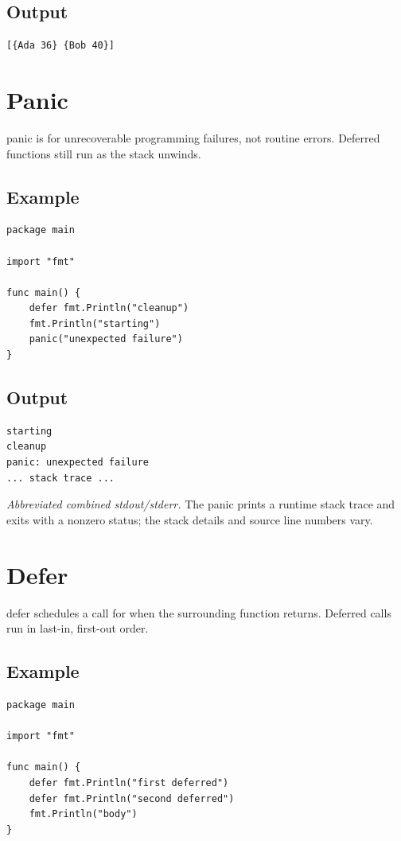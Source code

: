 \documentclass[10pt,oneside]{article}
\newcommand{\sectionline}{\par\vspace{4pt}{\color{rule}\hrule height .5pt}\vspace{7pt}\color{ink}\noindent}
\begin{document}
\subsection*{Output}
\begin{lstlisting}[style=terminal]
[{Ada 36} {Bob 40}]
\end{lstlisting}
\clearpage
\section{Panic}
\sectionline
panic is for unrecoverable programming failures, not routine errors. Deferred functions still run as the stack unwinds.\par
\subsection*{Example}
\begin{lstlisting}[style=gocode]
package main

import "fmt"

func main() {
	defer fmt.Println("cleanup")
	fmt.Println("starting")
	panic("unexpected failure")
}
\end{lstlisting}


\subsection*{Output}
\begin{lstlisting}[style=terminal]
starting
cleanup
panic: unexpected failure
... stack trace ...
\end{lstlisting}
\emph{Abbreviated combined stdout/stderr.} The panic prints a runtime stack trace and exits with a nonzero status; the stack details and source line numbers vary.
\clearpage
\section{Defer}
\sectionline
defer schedules a call for when the surrounding function returns. Deferred calls run in last-in, first-out order.\par
\subsection*{Example}
\begin{lstlisting}[style=gocode]
package main

import "fmt"

func main() {
	defer fmt.Println("first deferred")
	defer fmt.Println("second deferred")
	fmt.Println("body")
}
\end{lstlisting}
\end{document}
